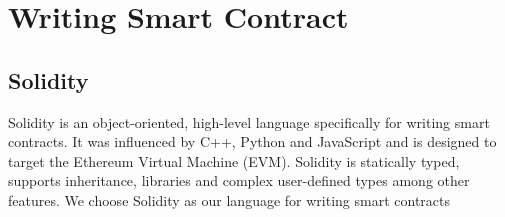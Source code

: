 \documentclass{article}
\begin{document}




\section{Writing Smart Contract}
\subsection{Solidity}
Solidity is an object-oriented, high-level language specifically for writing smart contracts. It was influenced by C++, Python and JavaScript and is designed to target the Ethereum Virtual Machine (EVM). Solidity is statically typed, supports inheritance, libraries and complex user-defined types among other features. We choose Solidity as our language for writing smart contracts 
\end{document}
